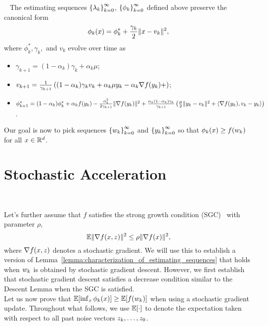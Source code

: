 \begin{lemma}~\label{lemma:cannonical_form}
    The estimating sequences \( \left\{\lambda_k\right\}_{k=0}^\infty \), \( \left\{\phi_k\right\}_{k=0}^\infty \) defined above preserve the canonical form
    \[ \phi_{k}(x) = \phi_k^* + \frac{\gamma_k}{2}\|x - v_k\|^2, \]
    where \( \phi_k^*, \gamma_k, \) and \( v_k \) evolve over time as
    \begin{itemize}
        \item \( \gamma_{k+1} = (1-\alpha_k) \gamma_k + \alpha_k \mu \);
        \item \( v_{k+1} = \frac{1}{\gamma_{k+1}} \left( (1-\alpha_k) \gamma_k v_k + \alpha_k \mu y_k - \alpha_k \nabla f(y_k) + \right) \);
        \item \( \phi_{k+1}^* = (1- \alpha_k) \phi_k^* + \alpha_k f(y_k) - \frac{\alpha_k^2}{2\gamma_{k+1}}\|\nabla f(y_k)\|^2 + \frac{\alpha_k(1-\alpha_k)\gamma_k}{\gamma_{k+1}}\left(\frac{\mu}{2} \|y_k - v_k\|^2 + \left\langle\nabla f(y_k), v_k - y_k\right\rangle\right) \).
    \end{itemize}
\end{lemma}

Our goal is now to pick sequences \( \left\{w_k\right\}_{k=0}^\infty \) and \( \left\{y_k\right\}_{k=0}^\infty \) so that \( \phi_k(x) \geq f(w_k) \) for all \( x \in \mathbb{R}^d \).

\section{Stochastic Acceleration}~\label{sec:stochastic-acceleration}

Let's further assume that \( f \) satisfies the strong growth condition (SGC)~\citep{solodov1998incremental, tseng1998incremental, schmidt2013fast, vaswani2019fast} with parameter \( \rho \),
\[ \mathbb{E} \|\nabla f(x, z)\|^2 \leq \rho \|\nabla f(x)\|^2, \]
where \( \nabla f(x,z) \) denotes a stochastic gradient.
We will use this to establish a version of Lemma~\ref{lemma:characterization_of_estimating_sequences} that holds when \( w_k \) is obtained by stochastic gradient descent.
However, we first establish that stochastic gradient descent satisfies a decrease condition similar to the Descent Lemma when the SGC is satisfied.\\

Let us now prove that \( \mathbb{E}[\inf_x \phi_k(x)] \geq \mathbb{E}[f(w_k)] \) when using a stochastic gradient update.
Throughout what follows, we use \( \mathbb{E}[\cdot] \) to denote the expectation taken with respect to all past noise vectors \( z_{k}, \dots, z_0 \).\\

